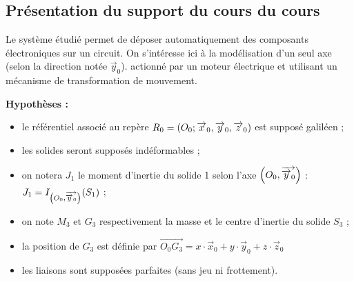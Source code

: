 \documentclass[10pt,fleqn]{article} %
\begin{document}
\subsection{Présentation du support du cours du cours}



\begin{exemple}
Le système étudié permet de déposer automatiquement des composants électroniques sur un circuit.
On s'intéresse ici à la modélisation d'un seul axe (selon la direction notée $\overrightarrow{y}_0$). actionné par un moteur électrique et utilisant un mécanisme de transformation de mouvement.

\textbf{Hypothèses :}
\begin{itemize}
\item le référentiel associé au repère $R_0=\left(O_0;\overrightarrow{x}_0,\overrightarrow{y}_0,\overrightarrow{z}_0 \right)$ est supposé galiléen ;
\item les solides seront supposés indéformables ; 
\item on notera $J_1$ le moment d'inertie du solide 1 selon l'axe $\left(O_0,\overrightarrow{\overrightarrow{y}_0}\right)$ : $J_1=I_{\left(O_0,\overrightarrow{\overrightarrow{y}_0}\right)}(S_1)$ ;
\item on note $M_3$ et $G_3$ respectivement la masse et le centre d'inertie du solide $S_3$ ;
\item la position de $G_3$ est définie par $\overrightarrow{O_0G_3}=x\cdot \overrightarrow{x}_0+y\cdot \overrightarrow{y}_0+z\cdot \overrightarrow{z}_0$
\item les liaisons sont supposées parfaites (sans jeu ni frottement).
\end{itemize}


\end{exemple}
\end{document}
